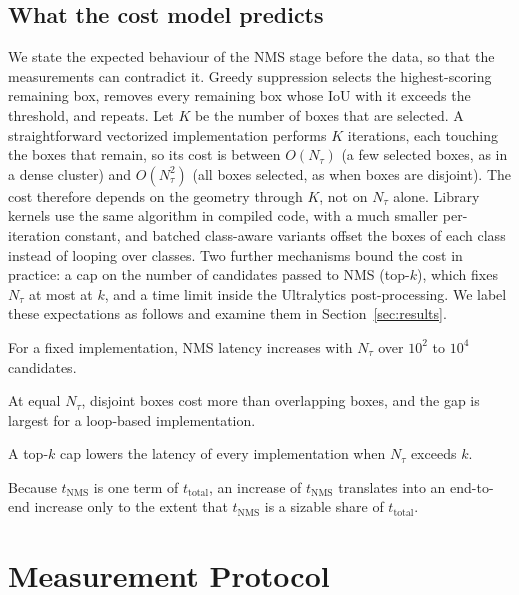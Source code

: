 \documentclass[a4paper,fleqn]{cas-dc}
\newcommand{\Ntau}{N_{\tau}}
\begin{document}
\subsection{What the cost model predicts}
We state the expected behaviour of the NMS stage before the data, so that the measurements can contradict it. Greedy suppression selects the highest-scoring remaining box, removes every remaining box whose IoU with it exceeds the threshold, and repeats. Let $K$ be the number of boxes that are selected. A straightforward vectorized implementation performs $K$ iterations, each touching the boxes that remain, so its cost is between $O(\Ntau)$ (a few selected boxes, as in a dense cluster) and $O(\Ntau^2)$ (all boxes selected, as when boxes are disjoint). The cost therefore depends on the geometry through $K$, not on $\Ntau$ alone. Library kernels use the same algorithm in compiled code, with a much smaller per-iteration constant, and batched class-aware variants offset the boxes of each class instead of looping over classes. Two further mechanisms bound the cost in practice: a cap on the number of candidates passed to NMS (top-$k$), which fixes $\Ntau$ at most at $k$, and a time limit inside the Ultralytics post-processing. We label these expectations as follows and examine them in Section~\ref{sec:results}.
\begin{description}[leftmargin=2.2em,labelwidth=2em,itemsep=1pt]
\item[H1] For a fixed implementation, NMS latency increases with $\Ntau$ over $10^2$ to $10^4$ candidates.
\item[H2] At equal $\Ntau$, disjoint boxes cost more than overlapping boxes, and the gap is largest for a loop-based implementation.
\item[H3] A top-$k$ cap lowers the latency of every implementation when $\Ntau$ exceeds $k$.
\item[H4] Because $t_{\mathrm{NMS}}$ is one term of $t_{\mathrm{total}}$, an increase of $t_{\mathrm{NMS}}$ translates into an end-to-end increase only to the extent that $t_{\mathrm{NMS}}$ is a sizable share of $t_{\mathrm{total}}$.
\end{description}

\section{Measurement Protocol}
\end{document}
